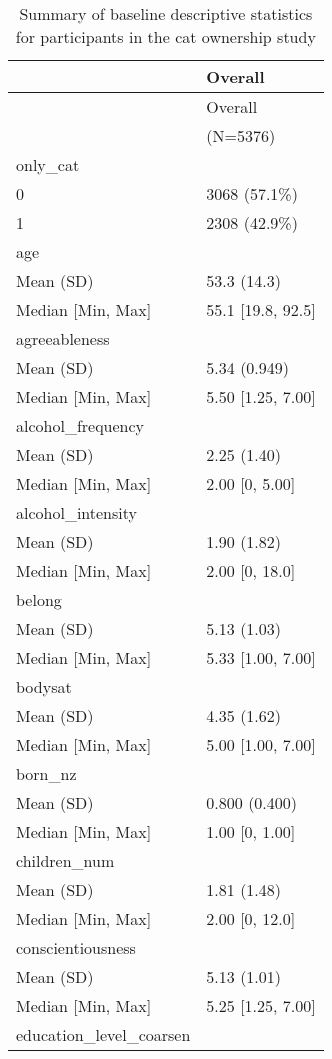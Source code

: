 \documentclass[
  singlecolumn,
  9pt]{article}
\begin{document}
\begin{longtable}[]{@{}ll@{}}
\caption{Summary of baseline descriptive statistics for participants in
the cat ownership study}\label{tbl-baseline-cats}\tabularnewline
\toprule\noalign{}
& Overall \\
\midrule\noalign{}
\endfirsthead
\toprule\noalign{}
& Overall \\
\midrule\noalign{}
\endhead
\bottomrule\noalign{}
\endlastfoot
& (N=5376) \\
only\_cat & \\
0 & 3068 (57.1\%) \\
1 & 2308 (42.9\%) \\
age & \\
Mean (SD) & 53.3 (14.3) \\
Median {[}Min, Max{]} & 55.1 {[}19.8, 92.5{]} \\
agreeableness & \\
Mean (SD) & 5.34 (0.949) \\
Median {[}Min, Max{]} & 5.50 {[}1.25, 7.00{]} \\
alcohol\_frequency & \\
Mean (SD) & 2.25 (1.40) \\
Median {[}Min, Max{]} & 2.00 {[}0, 5.00{]} \\
alcohol\_intensity & \\
Mean (SD) & 1.90 (1.82) \\
Median {[}Min, Max{]} & 2.00 {[}0, 18.0{]} \\
belong & \\
Mean (SD) & 5.13 (1.03) \\
Median {[}Min, Max{]} & 5.33 {[}1.00, 7.00{]} \\
bodysat & \\
Mean (SD) & 4.35 (1.62) \\
Median {[}Min, Max{]} & 5.00 {[}1.00, 7.00{]} \\
born\_nz & \\
Mean (SD) & 0.800 (0.400) \\
Median {[}Min, Max{]} & 1.00 {[}0, 1.00{]} \\
children\_num & \\
Mean (SD) & 1.81 (1.48) \\
Median {[}Min, Max{]} & 2.00 {[}0, 12.0{]} \\
conscientiousness & \\
Mean (SD) & 5.13 (1.01) \\
Median {[}Min, Max{]} & 5.25 {[}1.25, 7.00{]} \\
education\_level\_coarsen & \\

\end{longtable}
\end{document}
